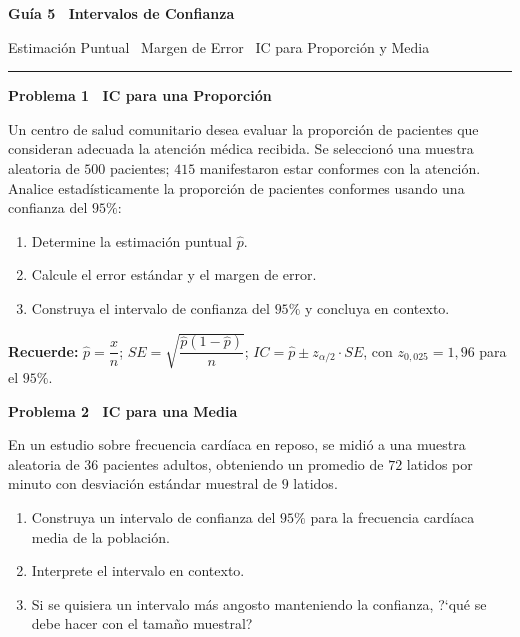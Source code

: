 \documentclass[10pt,letterpaper]{article}
\newcommand{\seccion}[1]{%
  \vspace{2pt}%
  \begin{tcolorbox}[enhanced,colback=white,colframe=black,arc=0pt,boxrule=0pt,
    leftrule=2pt,left=6pt,right=6pt,top=1pt,bottom=1pt]
    {\normalsize\bfseries\sffamily #1}
  \end{tcolorbox}%
  \vspace{1pt}%
}
\newcommand{\reglacaja}[1]{%
  \begin{tcolorbox}[enhanced,colback=white,colframe=black,arc=0pt,boxrule=0.5pt,
    left=6pt,right=6pt,top=2pt,bottom=2pt,breakable]
  \small\sffamily #1
  \end{tcolorbox}%
}
\begin{document}
\thispagestyle{empty}

\begin{center}
  {\fontsize{15}{17}\selectfont\bfseries\sffamily Gu\'ia 5 \textendash\ Intervalos de Confianza\par}
  \vspace{0.05cm}
  {\small\sffamily Estimaci\'on Puntual \textperiodcentered\ Margen de Error \textperiodcentered\ IC para Proporci\'on y Media\par}
  {\rule{3cm}{0.6pt}}
\end{center}

\vspace{0.15cm}

\seccion{Problema 1 \textendash\ IC para una Proporci\'on}

\noindent\sffamily\small Un centro de salud comunitario desea evaluar la proporci\'on de pacientes que consideran adecuada la atenci\'on m\'edica recibida. Se seleccion\'o una muestra aleatoria de $500$ pacientes; $415$ manifestaron estar conformes con la atenci\'on. Analice estad\'isticamente la proporci\'on de pacientes conformes usando una confianza del $95\%$:

\begin{enumerate}[leftmargin=1.2cm, label=\textbf{\alph*)}, itemsep=2pt, topsep=2pt]
  \item Determine la estimaci\'on puntual $\hat{p}$.
  \item Calcule el error est\'andar y el margen de error.
  \item Construya el intervalo de confianza del $95\%$ y concluya en contexto.
\end{enumerate}

\reglacaja{%
\textbf{Recuerde:} $\hat{p}=\dfrac{x}{n}$;\quad
$SE=\sqrt{\dfrac{\hat{p}(1-\hat{p})}{n}}$;\quad
$IC = \hat{p} \pm z_{\alpha/2}\cdot SE$, con $z_{0{,}025}=1{,}96$ para el $95\%$.%
}

\seccion{Problema 2 \textendash\ IC para una Media}

\noindent\sffamily\small En un estudio sobre frecuencia card\'iaca en reposo, se midi\'o a una muestra aleatoria de $36$ pacientes adultos, obteniendo un promedio de $72$ latidos por minuto con desviaci\'on est\'andar muestral de $9$ latidos.

\begin{enumerate}[leftmargin=1.2cm, label=\textbf{\alph*)}, itemsep=2pt, topsep=2pt]
  \item Construya un intervalo de confianza del $95\%$ para la frecuencia card\'iaca media de la poblaci\'on.
  \item Interprete el intervalo en contexto.
  \item Si se quisiera un intervalo m\'as angosto manteniendo la confianza, ?`qu\'e se debe hacer con el tama\~no muestral?
\end{enumerate}
\end{document}
